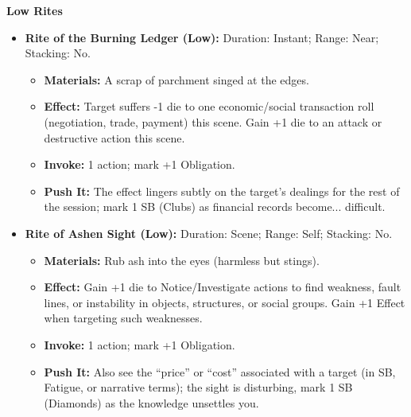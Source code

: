 \documentclass[11pt,letterpaper]{article}
\newcommand{\patronbox}[1]{\noindent\textbf{#1}\\}
\begin{document}
\patronbox{Low Rites}
\begin{itemize}[leftmargin=*]
    \item \textbf{Rite of the Burning Ledger (Low):} Duration: Instant; Range: Near; Stacking: No.
    \begin{itemize}
        \item \textbf{Materials:} A scrap of parchment singed at the edges.
        \item \textbf{Effect:} Target suffers -1 die to one economic/social transaction roll (negotiation, trade, payment) this scene. Gain +1 die to an attack or destructive action this scene.
        \item \textbf{Invoke:} 1 action; mark +1 Obligation.
        \item \textbf{Push It:} The effect lingers subtly on the target's dealings for the rest of the session; mark 1 SB (Clubs) as financial records become... difficult.
    \end{itemize}
    \item \textbf{Rite of Ashen Sight (Low):} Duration: Scene; Range: Self; Stacking: No.
    \begin{itemize}
        \item \textbf{Materials:} Rub ash into the eyes (harmless but stings).
        \item \textbf{Effect:} Gain +1 die to Notice/Investigate actions to find weakness, fault lines, or instability in objects, structures, or social groups. Gain +1 Effect when targeting such weaknesses.
        \item \textbf{Invoke:} 1 action; mark +1 Obligation.
        \item \textbf{Push It:} Also see the ``price'' or ``cost'' associated with a target (in SB, Fatigue, or narrative terms); the sight is disturbing, mark 1 SB (Diamonds) as the knowledge unsettles you.
    \end{itemize}
\end{itemize}
\end{document}
